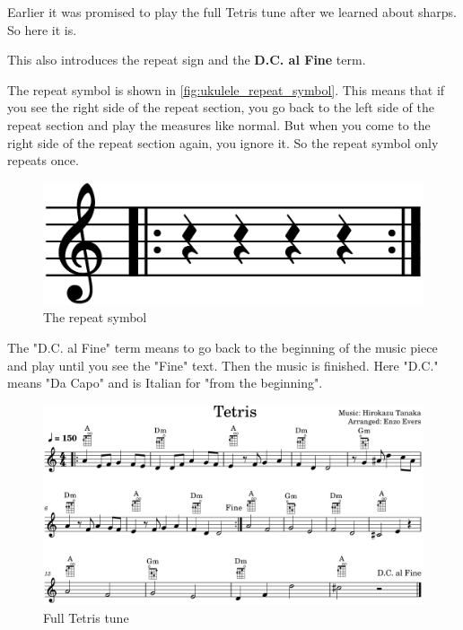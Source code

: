 Earlier it was promised to play the full Tetris tune after we learned about sharps. So here it is.

This also introduces the repeat sign and the \textbf{D.C. al Fine} term.

The repeat symbol is shown in \autoref{fig:ukulele_repeat_symbol}. This means that if you see the right side of the repeat section, you go back to the left side of the repeat section and play the measures like normal. But when you come to the right side of the repeat section again, you ignore it. So the repeat symbol only repeats once.

\begin{figure}[h]
	\centering
	\includegraphics[height=0.05\textheight]{../../MuseScore/Ukulele/UkuleleRepeatSymbol.png}
	\caption{The repeat symbol}
	\label{fig:ukulele_repeat_symbol}
\end{figure}

The "D.C. al Fine" term means to go back to the beginning of the music piece and play until you see the "Fine" text. Then the music is finished. Here "D.C." means "Da Capo" and is Italian for "from the beginning".

\begin{figure}[h]
	\centering
	\includegraphics[width=\textwidth]{../../MuseScore/Ukulele/UkuleleTetrisFull.png}
	\caption{Full Tetris tune}
	\label{fig:ukulele_tetris_full}
\end{figure}

